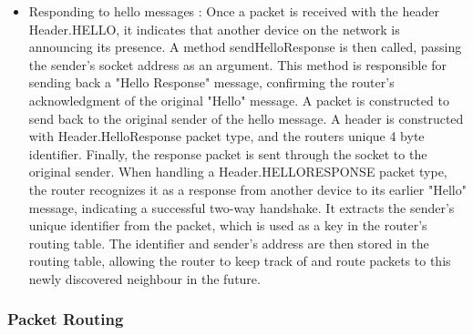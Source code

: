 \documentclass{article}
\begin{document}
\begin{itemize}
	\item Responding to hello messages : Once a packet is received with the header Header.HELLO, it indicates that another device on the network is announcing its presence. A method sendHelloResponse is then called, passing the sender's socket address as an argument. This method is responsible for sending back a "Hello Response" message, confirming the router's acknowledgment of the original "Hello" message. A packet is constructed to send back to the original sender of the hello message. A header is constructed with Header.HelloResponse packet type, and the routers unique 4 byte identifier. Finally, the response packet is sent through the socket to the original sender.
When handling a Header.HELLORESPONSE packet type, the router recognizes it as a response from another device to its earlier "Hello" message, indicating a successful two-way handshake. It extracts the sender's unique identifier from the packet, which is used as a key in the router's routing table. The identifier and sender's address are then stored in the routing table, allowing the router to keep track of and route packets to this newly discovered neighbour in the future.
\end{itemize}

\subsubsection*{Packet Routing}
\end{document}
